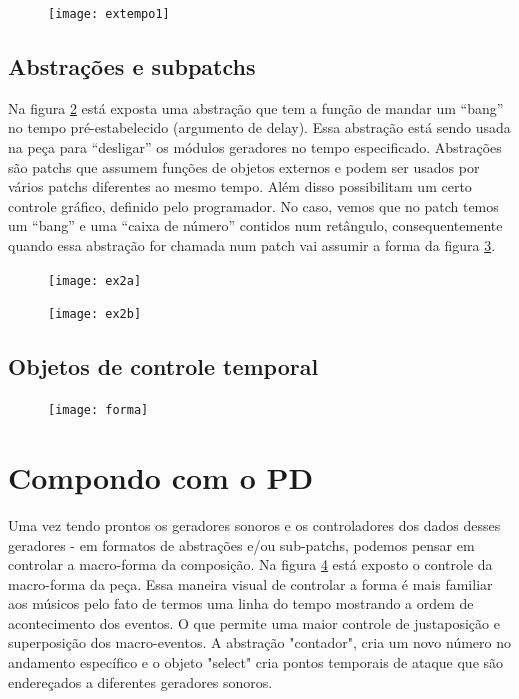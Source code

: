 \documentclass[12pt]{article}
\begin{document}
\begin{figure}[hp]
  \centering
  \texttt{[image: extempo1]}
  \caption{}
    \label{fig:extempo1}
\end{figure}


\subsection{Abstrações e subpatchs}
\label{sec:abstr-e-subp}
Na figura \ref{fig:2a} está exposta uma abstração que tem a função de mandar um 
“bang” no tempo pré-estabelecido (argumento de delay). Essa abstração está sendo usada
 na peça para “desligar” os módulos geradores no tempo especificado. Abstrações são patchs
 que assumem funções de objetos externos e podem ser usados por vários patchs diferentes 
 ao mesmo tempo. Além disso possibilitam um certo controle gráfico, definido pelo 
 programador. No caso, vemos que no patch temos um “bang” e uma “caixa de número” 
 contidos num retângulo, consequentemente quando essa abstração for chamada num patch 
 vai assumir a forma da figura \ref{fig:2b}.
\begin{figure}[hp]
  \centering
  \texttt{[image: ex2a]}
  \caption{}
    \label{fig:2a}
\end{figure}

\begin{figure}[hp]
  \centering
  \texttt{[image: ex2b]}
  \caption{}
    \label{fig:2b}
\end{figure}

\subsection{Objetos de controle temporal}
\label{sec:objetos-de-controle}

\begin{figure}[hp]
  \centering
  \texttt{[image: forma]}
  \caption{}
    \label{fig:forma}
\end{figure}

\section{Compondo com o PD}
\label{sec:compondo-com-o}



Uma vez tendo prontos os geradores sonoros e os controladores dos
dados desses geradores - em formatos de abstrações e/ou sub-patchs,
podemos pensar em controlar a macro-forma da composição. Na figura
\ref {fig:forma} está exposto o controle da macro-forma da peça. Essa maneira
visual de controlar a forma é mais familiar aos músicos pelo fato de
termos uma linha do tempo mostrando a ordem de acontecimento dos
eventos. O que permite uma maior controle de justaposição e
superposição dos macro-eventos. A abstração "contador", cria um novo
número no andamento específico e o objeto "select" cria pontos
temporais de ataque que são endereçados a diferentes geradores
sonoros.
\end{document}

